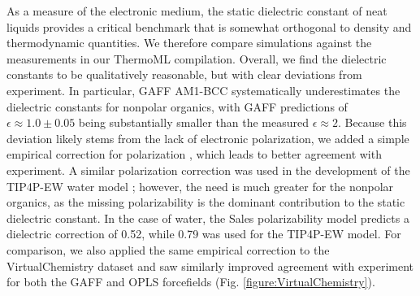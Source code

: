 \documentclass[journal=jacsat,manuscript=article]{achemso}
\begin{document}
As a measure of the electronic medium, the static dielectric constant of neat liquids provides a critical benchmark that is somewhat orthogonal to density and thermodynamic quantities.  We therefore compare simulations against the measurements in our ThermoML compilation.  Overall, we find the dielectric constants to be qualitatively reasonable, but with clear deviations from experiment.  In particular, GAFF AM1-BCC systematically underestimates the dielectric constants for nonpolar organics, with GAFF predictions of $\epsilon \approx 1.0 \pm 0.05$ being substantially smaller than the measured $\epsilon \approx 2$.  Because this deviation likely stems from the lack of electronic polarization, we added a simple empirical correction for polarization \cite{bosque2002polarizabilities}, which leads to better agreement with experiment.  A similar polarization correction was used in the development of the TIP4P-EW water model \cite{horn2004}; however, the need is much greater for the nonpolar organics, as the missing polarizability is the dominant contribution to the static dielectric constant.  In the case of water, the Sales polarizability model predicts a dielectric correction of 0.52, while 0.79 was used for the TIP4P-EW model.  For comparison, we also applied the same empirical correction to the VirtualChemistry dataset \cite{caleman2011force, van2012gromacs} and saw similarly improved agreement with experiment for both the GAFF and OPLS forcefields (Fig. \ref{figure:VirtualChemistry}).
\end{document}
